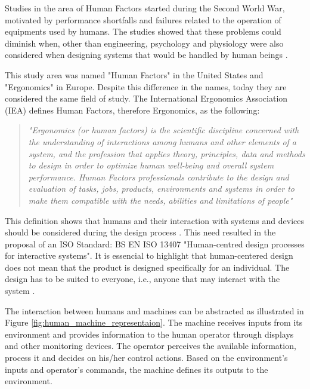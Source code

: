 Studies in the area of Human Factors started during the Second World War, motivated by performance shortfalls and failures related to the operation of equipments used by humans. The studies showed that these problems could diminish when, other than engineering, psychology and physiology were also considered when designing systems that would be handled by human beings \cite{sandom2004human}.

This study area was named "Human Factors" in the United States and "Ergonomics" in Europe. Despite this difference in the names, today they are considered the same field of study. The International Ergonomics Association (IEA) defines Human Factors, therefore Ergonomics, as the following:

\begin{quote}
    \textit{"Ergonomics (or human factors) is the scientific discipline concerned with the understanding of interactions among humans and other elements of a system, and the profession that applies theory, principles, data and methods to design in order to optimize human well-being and overall system performance. Human Factors professionals contribute to the design and evaluation of tasks, jobs, products, environments and systems in order to make them compatible with the needs, abilities and limitations of people"} %
\end{quote}

This definition shows that humans and their interaction with systems and devices should be considered during the design process \cite{sandom2004human, sanders1998human, dul2003ergonomics}. This need resulted in the proposal of an ISO Standard: BS EN ISO 13407 "Human-centred design processes for interactive systems". It is essencial to highlight that human-centered design does not mean that the product is designed specifically for an individual. The design has to be suited to everyone, i.e., anyone that may interact with the system \cite{dul2003ergonomics}.

The interaction between humans and machines can be abstracted as illustrated in Figure \ref{fig:human_machine_representaion}. The machine receives inputs from its environment and provides information to the human operator through displays and other monitoring devices. The operator perceives the available information, process it and decides on his/her control actions. Based on the environment's inputs and operator's commands, the machine defines its outputs to the environment.




